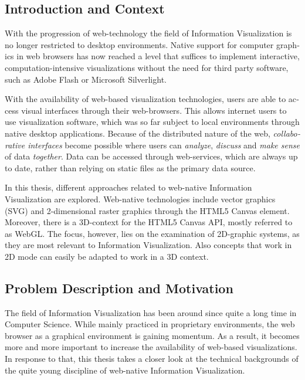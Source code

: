 \begin{english}
\chapter{Introduction and Context}
\label{cha:introduction}

With the progression of web-technology the field of Information Visualization is no longer restricted to desktop environments. Native support for computer graphics in web browsers has now reached a level that suffices to implement interactive, computation-intensive visualizations without the need for third party software, such as Adobe Flash or Microsoft Silverlight.

With the availability of web-based visualization technologies, users are able to access visual interfaces through their web-browsers. This allows internet users to use visualization software, which was so far subject to local environments through native desktop applications. Because of the distributed nature of the web, \emph{collaborative interfaces} become possible where users can \emph{analyze}, \emph{discuss} and \emph{make sense} of data \emph{together}. Data can be accessed through web-services, which are always up to date, rather than relying on static files as the primary data source.

In this thesis, different approaches related to web-native Information Visualization are explored. Web-native technologies include vector graphics (SVG) and 2-dimensional raster graphics through the HTML5 Canvas element. Moreover, there is a 3D-context for the HTML5 Canvas API, mostly referred to as WebGL. The focus, however, lies on the examination of 2D-graphic systems, as they are most relevant to Information Visualization. Also concepts that work in 2D mode can easily be adapted to work in a 3D context.


\section{Problem Description and Motivation}

The field of Information Visualization has been around since quite a long time in Computer Science. While mainly practiced in proprietary environments, the web browser as a graphical environment is gaining momentum. As a result, it becomes more and more important to increase the availability of web-based visualizations. In response to that, this thesis takes a closer look at the technical backgrounds of the quite young discipline of web-native Information Visualization.


\end{english}
